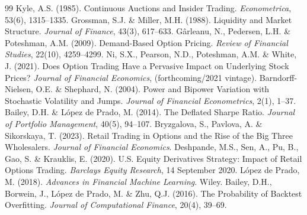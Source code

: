 \documentclass[11pt]{report}
\begin{document}
\begin{thebibliography}{99}
 Kyle, A.S. (1985). Continuous Auctions and Insider Trading. \textit{Econometrica}, 53(6), 1315--1335.
 Grossman, S.J. \& Miller, M.H. (1988). Liquidity and Market Structure. \textit{Journal of Finance}, 43(3), 617--633.
 Gârleanu, N., Pedersen, L.H. \& Poteshman, A.M. (2009). Demand-Based Option Pricing. \textit{Review of Financial Studies}, 22(10), 4259--4299.
 Ni, S.X., Pearson, N.D., Poteshman, A.M. \& White, J. (2021). Does Option Trading Have a Pervasive Impact on Underlying Stock Prices? \textit{Journal of Financial Economics}, (forthcoming/2021 vintage).
 Barndorff-Nielsen, O.E. \& Shephard, N. (2004). Power and Bipower Variation with Stochastic Volatility and Jumps. \textit{Journal of Financial Econometrics}, 2(1), 1--37.
 Bailey, D.H. \& López de Prado, M. (2014). The Deflated Sharpe Ratio. \textit{Journal of Portfolio Management}, 40(5), 94--107.
 Bryzgalova, S., Pavlova, A. \& Sikorskaya, T. (2023). Retail Trading in Options and the Rise of the Big Three Wholesalers. \textit{Journal of Financial Economics}.
 Deshpande, M.S., Sen, A., Pu, B., Gao, S. \& Krauklis, E. (2020). U.S. Equity Derivatives Strategy: Impact of Retail Options Trading. \textit{Barclays Equity Research}, 14 September 2020.
 L\'opez de Prado, M. (2018). \textit{Advances in Financial Machine Learning}. Wiley.
 Bailey, D.H., Borwein, J., L\'opez de Prado, M. \& Zhu, Q.J. (2016). The Probability of Backtest Overfitting. \textit{Journal of Computational Finance}, 20(4), 39--69.
\end{thebibliography}
\end{document}
